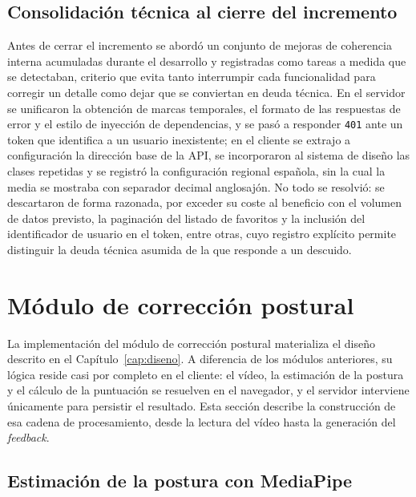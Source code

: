 \documentclass[12pt,a4paper,twoside,openright]{book}
\begin{document}
    \subsection{Consolidación técnica al cierre del incremento}

    Antes de cerrar el incremento se abordó un conjunto de mejoras de coherencia
    interna acumuladas durante el desarrollo y registradas como tareas a medida
    que se detectaban, criterio que evita tanto interrumpir cada funcionalidad
    para corregir un detalle como dejar que se conviertan en deuda técnica. En el
    servidor se unificaron la obtención de marcas temporales, el formato de las
    respuestas de error y el estilo de inyección de dependencias, y se pasó a
    responder \texttt{401} ante un token que identifica a un usuario inexistente;
    en el cliente se extrajo a configuración la dirección base de la API, se
    incorporaron al sistema de diseño las clases repetidas y se registró la
    configuración regional española, sin la cual la media se mostraba con
    separador decimal anglosajón. No todo se resolvió: se descartaron de forma
    razonada, por exceder su coste al beneficio con el volumen de datos previsto,
    la paginación del listado de favoritos y la inclusión del identificador de
    usuario en el token, entre otras, cuyo registro explícito permite distinguir
    la deuda técnica asumida de la que responde a un descuido.


    \section{Módulo de corrección postural}

    La implementación del módulo de corrección postural materializa el diseño
    descrito en el Capítulo~\ref{cap:diseno}. A diferencia de los módulos
    anteriores, su lógica reside casi por completo en el cliente: el vídeo, la
    estimación de la postura y el cálculo de la puntuación se resuelven en el navegador,
    y el servidor interviene únicamente para persistir el resultado. Esta sección
    describe la construcción de esa cadena de procesamiento, desde la lectura del
    vídeo hasta la generación del \textit{feedback}.

    \subsection{Estimación de la postura con MediaPipe}
\end{document}
